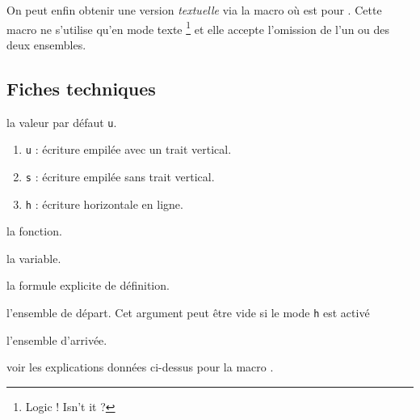 \documentclass[12pt,a4paper]{article}
\begin{document}



On peut enfin obtenir une version \emph{\og textuelle \fg} via la macro  où  est pour .
Cette macro ne s'utilise qu'en mode texte
\footnote{
	Logic ! Isn't it ?
}
et elle accepte l'omission de l'un ou des deux ensembles.

\begin{latexex}



\end{latexex}





\subsection{Fiches techniques}



\IDoption{}  la valeur par défaut \verb+u+. 
\begin{enumerate}
	\item \verb+u+ : écriture empilée avec un trait vertical.
	
	\item \verb+s+ : écriture empilée sans trait vertical.

	\item \verb+h+ : écriture horizontale en ligne.
\end{enumerate}


 la fonction.

 la variable.

 la formule explicite de définition.

 l'ensemble de départ. Cet argument peut être vide si le mode \verb+h+ est activé

 l'ensemble d'arrivée.


\separation




 voir les explications données ci-dessus pour la macro .
\end{document}
